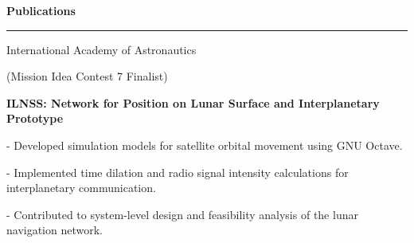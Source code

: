 \documentclass[10pt]{article}
\begin{document}
    \vspace{0.85em}

    \noindent
    \begin{minipage}{\textwidth}
        \large\textbf{Publications}\par
        \vspace{0.25em}
        \nointerlineskip
        \noindent
        \rule{0.25\textwidth}{0.4pt}
        \par

        \vspace{0.45em}
        \begin{minipage}{0.85\textwidth}
            \normalsize
            \begingroup
                International Academy of Astronautics\par
                (Mission Idea Contest 7 Finalist)\par
                \textbf{ILNSS: Network for Position on Lunar Surface and Interplanetary Prototype}\par
            \endgroup
        \end{minipage}
        \hfill
        \begin{minipage}{0.04\textwidth}
            \normalsize
            \endgroup
        \end{minipage}

        \vspace{0.35em}
        \hspace{0.1em}
        \begin{minipage}{0.99\textwidth}
            \normalsize
            \begingroup
            - \hspace{0.5em} Developed simulation models for satellite orbital movement using GNU Octave.\par
            - \hspace{0.5em} Implemented time dilation and radio signal intensity calculations for interplanetary communication.\par
            - \hspace{0.5em} Contributed to system-level design and feasibility analysis of the lunar navigation network.\par
            \endgroup
        \end{minipage}
    \end{minipage}

    \vspace{0.85em}
\end{document}
